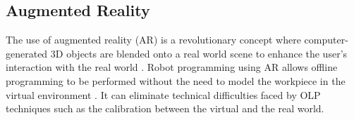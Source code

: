 \subsection{Augmented Reality}\label{sssec:Augmented Reality}
The use of augmented reality (AR) is a revolutionary concept where computer-generated 3D objects are blended onto a real world scene to enhance the user's interaction with the real world \cite{pettersen2003augmented}. 
Robot programming using AR allows offline programming to be performed without the need to model the workpiece in the virtual environment \cite{pan2012recent}. 
It can eliminate technical difficulties faced by OLP techniques such as the calibration between the virtual and the real world.
